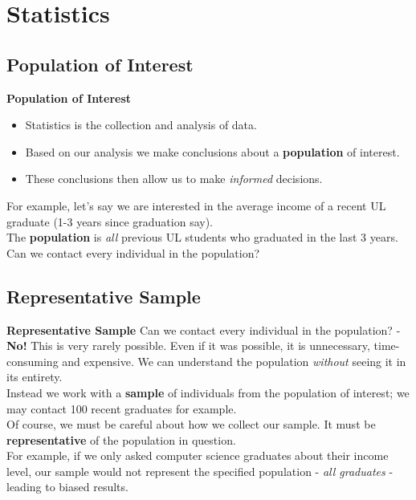 \documentclass[compress]{beamer}        %
\makeatletter
\newcommand{\tcb}{\textcolor{beamer@blendedblue}}
\makeatother
\begin{document}
\section{Statistics}
\subsection{Population of Interest}
\begin{frame}{\bf \tcb{Population of Interest}}
\begin{itemize}\itemsep0.2cm
\item Statistics is the collection and analysis of data.
\item Based on our analysis we make conclusions about a {\bf population} of interest.
\item These conclusions then allow us to make \emph{informed} decisions.\\[0.8cm]
\end{itemize}
For example, let's say we are interested in the average income of a recent UL graduate (1-3 years since graduation say).\\[0.5cm]

The {\bf population} is \emph{all} previous UL students who graduated in the last 3 years.\\[0.5cm]

Can we contact every individual in the population?
\end{frame}

\subsection{Representative Sample}
\begin{frame}{\bf \tcb{Representative Sample}}
Can we contact every individual in the population? - {\bf No!} This is very rarely possible. Even if it was possible, it is unnecessary, time-consuming and expensive. We can understand the population \emph{without} seeing it in its entirety.\\[0.6cm]
Instead we work with a {\bf sample} of individuals from the population of interest; we may contact 100 recent graduates for example.\\[0.6cm]
Of course, we must be careful about how we collect our sample. It must be {\bf representative} of the population in question.\\[0.6cm]
For example, if we only asked computer science graduates about their income level, our sample would not represent the specified population - \emph{all graduates} - leading to biased results.
\end{frame}
\end{document}
